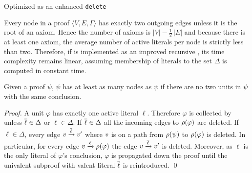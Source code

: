 \documentclass{llncs}
\begin{document}
\begin{algorithm}[pbt]
{%
  }
  \BlankLine


  \caption{Optimized {\LowerUnivalents} as an enhanced \texttt{delete}}
  \label{algo:fullLUniv}
\end{algorithm}


Every node in a proof $\langle V, E, \Gamma \rangle$ has exactly two outgoing edges unless it is the
root of an axiom. Hence the number of axioms is $|V| - \frac{1}{2}\,|E|$ and because there is at
least one axiom, the average number of active literals per node is strictly less than two.
Therefore, if {\LowerUnivalents} is implemented as an improved recursive , its time
complexity remains linear, assuming membership of literals to the set $\Delta$ is computed in constant
time.

\begin{proposition} \label{prop:compression}
Given a proof $\psi$,
{\LowerUnits\unskip\FuncSty{(}$\psi$\FuncSty{)}}
has at least as many nodes as 
{\LowerUnivalents\unskip\FuncSty{(}$\psi$\FuncSty{)}}
if there are no two units in $\psi$ with the same conclusion.
\end{proposition}

\begin{proof}
A unit $\varphi$ has exactly one active literal $\ell$. Therefore $\varphi$ is collected by
{\LowerUnivalents} unless $\overline{\ell} \in \Delta$ or $\ell \in \Delta$. If $\overline{\ell} \in \Delta$
all the incoming edges to $\rho(\varphi)$ are deleted. If $\ell \in \Delta$, every edge
$v \xrightarrow{\overline{\ell}} v'$ where $v$ is on a path from $\rho(\psi)$ to $\rho(\varphi)$
is deleted.
In particular, for every edge $v \xrightarrow{\ell} \rho(\varphi)$ the edge $v
\xrightarrow{\overline{\ell}} v'$ is deleted.  Moreover, as $\ell$ is the only literal of $\varphi$'s
conclusion, $\varphi$ is propagated down the proof until the univalent subproof with valent literal
$\overline{\ell}$ is reintroduced. \qed
\end{proof}
\end{document}

